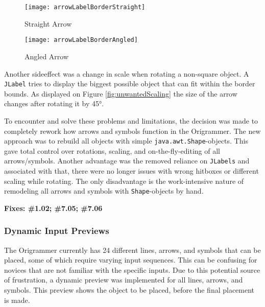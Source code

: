 \begin{figure*}[htbp]
	\centering
	\begin{subfigure}{0.25\textwidth}
		\texttt{[image: arrowLabelBorderStraight]}
		\caption{Straight Arrow}
		\label{fig:arrowLabelBorderStraight}
	\end{subfigure}
	\begin{subfigure}{0.25\textwidth}
		\texttt{[image: arrowLabelBorderAngled]}
		\caption{Angled Arrow}
		\label{fig:arrowLabelBorderAngled}
	\end{subfigure}
	\caption{Unwanted scaling when rotating the wrong,\\ always square hitbox, regardless of arrow shape}
	\label{fig:unwantedScaling}
\end{figure*}
\noindent Another sideeffect was a change in scale when rotating a non-square object. A \texttt{JLabel} tries to display the biggest possible object that can fit within the border bounds. As displayed on Figure \ref{fig:unwantedScaling} the size of the arrow changes after rotating it by 45°.

\noindent To encounter and solve these problems and limitations, the decision was made to completely rework how arrows and symbols function in the Origrammer. The new approach was to rebuild all objects with simple \texttt{java.awt.Shape}-objects. This gave total control over rotations, scaling, and on-the-fly-editing of all arrows/symbols. Another advantage was the removed reliance on \texttt{JLabels} and associated with that, there were no longer issues with wrong hitboxes or different scaling while rotating. The only disadvantage is the work-intensive nature of remodeling all arrows and symbols with \texttt{Shape}-objects by hand.

\textbf{Fixes: \#1.02; \#7.05; \#7.06}

\subsubsection{Dynamic Input Previews}

The Origrammer currently has 24 different lines, arrows, and symbols that can be placed, some of which require varying input sequences. This can be confusing for novices that are not familiar with the specific inputs. Due to this potential source of frustration, a dynamic preview was implemented for all lines, arrows, and symbols. This preview shows the object to be placed, before the final placement is made.

